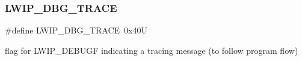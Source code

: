 \subsubsection{\texorpdfstring{L\+W\+I\+P\+\_\+\+D\+B\+G\+\_\+\+T\+R\+A\+CE}{LWIP\_DBG\_TRACE}\hspace{0.1cm}{\footnotesize\ttfamily [2/2]}}
{\footnotesize\ttfamily \#define L\+W\+I\+P\+\_\+\+D\+B\+G\+\_\+\+T\+R\+A\+CE~0x40U}

flag for L\+W\+I\+P\+\_\+\+D\+E\+B\+U\+GF indicating a tracing message (to follow program flow) 
